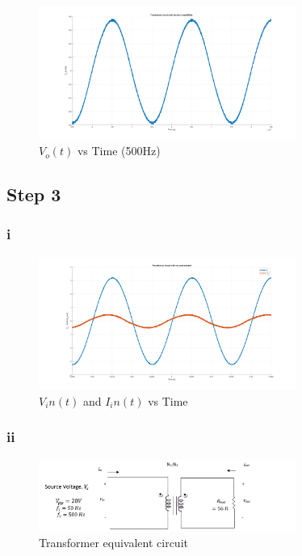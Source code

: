 \documentclass[letterpaper,12pt]{article}
\begin{document}
\begin{figure}[H]
    \centering
    \includegraphics[width = 0.75\textwidth]{2_3_2.png}
    \caption{\(V_o(t) \) vs Time (500Hz)}
\end{figure} 
%
\subsection{Step 3}

\subsubsection{i}

\begin{figure}[H]
    \centering
    \includegraphics[width = 0.75\textwidth]{3_1.png}
    \caption{\(V_in(t) \) and \(I_in(t)\) vs Time }
\end{figure} 

\subsubsection{ii}
\begin{figure}[H]
    \centering
    \includegraphics[width = 0.75\textwidth]{2.png}
    \caption{Transformer equivalent circuit}
\end{figure} 
%
\end{document}
